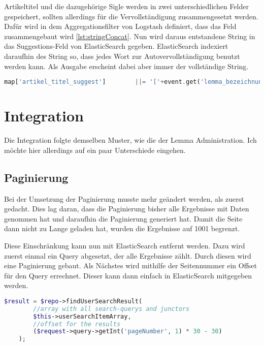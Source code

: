 Artikeltitel und die dazugehörige Sigle werden in zwei unterschiedlichen Felder gespeichert, sollten allerdings für die Vervollständigung zusammengesetzt werden.
Dafür wird in dem Aggregationsfilter von Logstash definiert, dass das Feld zusammengebaut wird \ref{lst:stringConcat}. Nun wird daraus entstandene String in das Suggestions-Feld von ElasticSearch gegeben. ElasticSearch indexiert daraufhin des String so, dass jedes Wort zur Autovervollständigung benutzt werden kann. Als Ausgabe erscheint dabei aber immer der vollständige String.

\begin{lstlisting}[language=PHP, frame=single, label={lst:stringConcat}] 
    map['artikel_titel_suggest']        ||= '['+event.get('lemma_bezeichnung').to_s+'] '+event.get('artikel_titel').to_s
\end{lstlisting}


\section{Integration}

Die Integration folgte demselben Muster, wie die der Lemma Administration. Ich möchte hier allerdings auf ein paar Unterschiede eingehen. 



\subsection{Paginierung}

Bei der Umsetzung der Paginierung musste mehr geändert werden, als zuerst gedacht. Dies lag daran, dass die Paginierung bisher alle Ergebnisse mit Daten genommen hat und daraufhin die Paginierung generiert hat. Damit die Seite dann nicht zu Lange geladen hat, wurden die Ergebnisse auf 1001 begrenzt.

Diese Einschränkung kann nun mit ElasticSearch entfernt werden. Dazu wird zuerst einmal ein Query abgesetzt, der alle Ergebnisse zählt. Durch diesen wird eine Paginierung gebaut. Als Nächstes wird mithilfe der Seitennummer ein Offset für den Query errechnet. Dieser kann dann einfach in ElasticSearch mitgegeben werden.

\begin{lstlisting}[language=PHP, frame=single, label={lst:generierung}] 
    $result = $repo->findUserSearchResult(
        //array with all search-querys and junctors
        $this->userSearchItemArray, 
        //offset for the results
        ($request->query->getInt('pageNumber', 1) * 30 - 30)
    );
\end{lstlisting}

